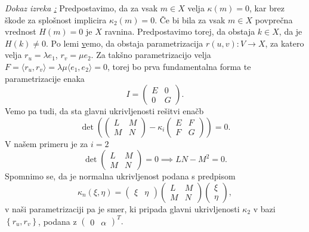 \noindent
{\em Dokaz izreka \href{izr_plsokev_je_ploscata_ce_je_del_valja_ali_tangentnopremosnosne_ploskve}:\/}
Predpostavimo, da za vsak $m \in X$ velja $\kappa(m) = 0$, kar brez škode za splošnost implicira $\kappa_2(m) = 0$. Če bi bila za vsak $m \in X$ povprečna vrednost $H(m) = 0$ je $X$ ravnina. Predpostavimo torej, da obstaja
$k \in  X$, da je $H(k) \neq 0$.
Po lemi \href{lem_obstoj_funkcij} vemo, da obstaja parametrizacija $r(u,v): V \to X$, za katero velja $r_u = \lambda e_1$, $r_v = \mu e_2$. 
Za takšno parametrizacijo velja $F = \langle r_u, r_v \rangle = \lambda \mu \langle e_1, e_2 \rangle = 0$, torej bo prva fundamentalna forma te parametrizacije enaka \begin{equation*}
I = \begin{pmatrix}
E & 0 \\
0 & G
\end{pmatrix}.
\end{equation*}  
Vemo pa tudi, da sta glavni ukrivljenosti rešitvi enačb \begin{equation*} \det \left( \begin{pmatrix}
  L & M \\
  M & N
  \end{pmatrix} - \kappa_i \begin{pmatrix}
  E & F \\
  F & G
  \end{pmatrix}  \right) = 0. \end{equation*}
V našem primeru je za $i = 2$ \begin{equation*}
  \det  \begin{pmatrix}
    L & M \\
    M & N
    \end{pmatrix} = 0 \implies LN - M^2 = 0.
\end{equation*}  
Spomnimo se, da je normalna ukrivljenost podana s predpisom \begin{equation*}
\kappa_n(\xi, \eta) = \begin{pmatrix}
    \xi & \eta
\end{pmatrix} \begin{pmatrix}
L & M \\
M & N
\end{pmatrix} \begin{pmatrix}
  \xi \\ \eta
\end{pmatrix},
\end{equation*}  
v naši parametrizaciji pa je smer, ki pripada glavni ukrivljenosti $\kappa_2$ v bazi $\left\{ r_u, r_v\right\}$, podana z $\begin{pmatrix}
    0 & \alpha
\end{pmatrix}^{T}.$
